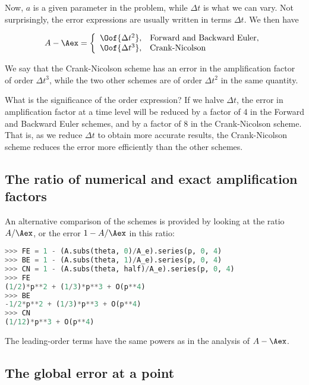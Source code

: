 \documentclass[graybox,sectrefs,envcountresetchap,open=right,final]{svmonodo}
\begin{document}
Now, $a$ is a given parameter in the problem, while $\Delta t$ is
what we can vary. Not surprisingly, the error expressions are usually
written in terms $\Delta t$. We then have

\begin{equation}
A-\Aex = \left\lbrace\begin{array}{ll}
\Oof{\Delta t^2}, & \hbox{Forward and Backward Euler},\\ 
\Oof{\Delta t^3}, & \hbox{Crank-Nicolson}
\end{array}\right.
\end{equation}

We say that the Crank-Nicolson scheme has an error in the amplification
factor of order $\Delta t^3$, while the two other schemes are
of order $\Delta t^2$ in the same quantity.

What is the significance of the order expression? If we halve $\Delta t$,
the error in amplification factor at a time level will be reduced
by a factor of 4 in the Forward and Backward Euler schemes, and by
a factor of 8 in the Crank-Nicolson scheme. That is, as we
reduce $\Delta t$ to obtain more accurate results, the Crank-Nicolson
scheme reduces the error more efficiently than the other schemes.


\subsection{The ratio of numerical and exact amplification factors}


An alternative comparison of the schemes is provided by looking at the
ratio $A/\Aex$, or the error $1-A/\Aex$ in this ratio:

\begin{lstlisting}[language=Python,style=blue1_bluegreen]
>>> FE = 1 - (A.subs(theta, 0)/A_e).series(p, 0, 4)
>>> BE = 1 - (A.subs(theta, 1)/A_e).series(p, 0, 4)
>>> CN = 1 - (A.subs(theta, half)/A_e).series(p, 0, 4)
>>> FE
(1/2)*p**2 + (1/3)*p**3 + O(p**4)
>>> BE
-1/2*p**2 + (1/3)*p**3 + O(p**4)
>>> CN
(1/12)*p**3 + O(p**4)
\end{lstlisting}
The leading-order terms have the same powers as
in the analysis of $A-\Aex$.

\subsection{The global error at a point}
\label{decay:analysis:gobal:error}
\end{document}
